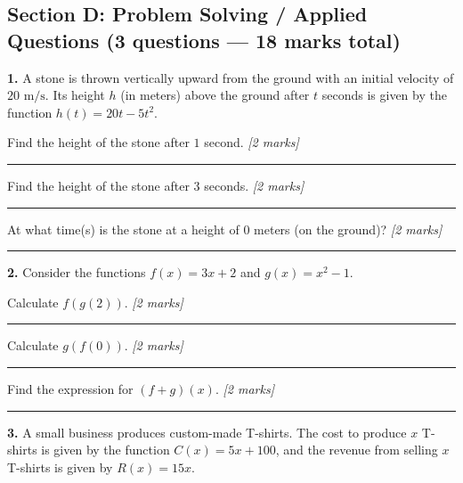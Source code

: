 \documentclass[12pt,a4paper]{article}
\begin{document}
\subsection*{Section D: Problem Solving / Applied Questions \normalfont\small (3 questions --- 18 marks total)}
\vspace{4pt}
\noindent\textbf{1.} A stone is thrown vertically upward from the ground with an initial velocity of $20 \text{ m/s}$. Its height $h$ (in meters) above the ground after $t$ seconds is given by the function $h(t) = 20t - 5t^2$.
\vspace{4pt}
\begin{subpartlist}
  \item Find the height of the stone after $1$ second. \hfill\textit{[2 marks]}
  \vspace{18pt}
  \noindent\rule{0.75\linewidth}{0.2pt}
  \item Find the height of the stone after $3$ seconds. \hfill\textit{[2 marks]}
  \vspace{18pt}
  \noindent\rule{0.75\linewidth}{0.2pt}
  \item At what time(s) is the stone at a height of $0$ meters (on the ground)? \hfill\textit{[2 marks]}
  \vspace{18pt}
  \noindent\rule{0.75\linewidth}{0.2pt}
\end{subpartlist}
\vspace{6pt}
\noindent\textbf{2.} Consider the functions $f(x) = 3x + 2$ and $g(x) = x^2 - 1$.
\vspace{4pt}
\begin{subpartlist}
  \item Calculate $f(g(2))$. \hfill\textit{[2 marks]}
  \vspace{18pt}
  \noindent\rule{0.75\linewidth}{0.2pt}
  \item Calculate $g(f(0))$. \hfill\textit{[2 marks]}
  \vspace{18pt}
  \noindent\rule{0.75\linewidth}{0.2pt}
  \item Find the expression for $(f+g)(x)$. \hfill\textit{[2 marks]}
  \vspace{18pt}
  \noindent\rule{0.75\linewidth}{0.2pt}
\end{subpartlist}
\vspace{6pt}
\noindent\textbf{3.} A small business produces custom-made T-shirts. The cost to produce $x$ T-shirts is given by the function $C(x) = 5x + 100$, and the revenue from selling $x$ T-shirts is given by $R(x) = 15x$.
\vspace{4pt}
\end{document}
